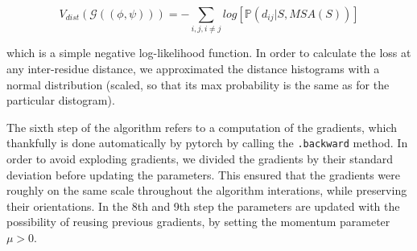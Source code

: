 \begin{equation}
     V_{dist}(\mathcal{G}((\phi, \psi))) = -\sum_{i, j, i \neq j} log[\mathds{P} (d_{ij} | S, MSA(S))]
     \label{eq:dist_pot}
\end{equation}

which is a simple negative log-likelihood function. In order to calculate the loss at any inter-residue distance, we approximated the distance histograms with a normal distribution (scaled, so that its max probability is the same as for the particular distogram).

The sixth step of the algorithm refers to a computation of the gradients, which thankfully is done automatically by pytorch by calling the \texttt{.backward} method. In order to avoid exploding gradients, we divided the gradients by their standard deviation before updating the parameters. This ensured that the gradients were roughly on the same scale throughout the algorithm interations, while preserving their orientations. In the 8th and 9th step the parameters are updated with the possibility of reusing previous gradients, by setting the momentum parameter $\mu > 0$.






